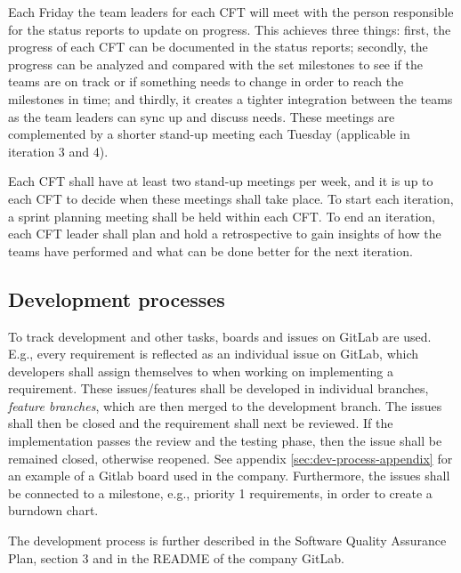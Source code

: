Each Friday the team leaders for each CFT will meet with the person responsible for the status reports to update on progress. This achieves three things: first, the progress of each CFT can be documented in the status reports; secondly, the progress can be analyzed and compared with the set milestones to see if the teams are on track or if something needs to change in order to reach the milestones in time; and thirdly, it creates a tighter integration between the teams as the  team leaders can sync up and discuss needs. These meetings are complemented by a shorter stand-up meeting each Tuesday (applicable in iteration 3 and 4). 

Each CFT shall have at least two stand-up meetings per week, and it is up to each CFT to decide when these meetings shall take place. To start each iteration, a sprint planning meeting shall be held within each CFT. To end an iteration, each CFT leader shall plan and hold a retrospective to gain insights of how the teams have performed and what can be done better for the next iteration. 

\subsection{Development processes}

To track development and other tasks, boards and issues on GitLab are used. E.g., every requirement is reflected as an individual issue on GitLab, which developers shall assign themselves to when working on implementing a requirement. These issues/features shall be developed in individual branches, \emph{feature branches}, which are then merged to the development branch. The issues shall then be closed and the requirement shall next be reviewed. If the implementation passes the review and the testing phase, then the issue shall be remained closed, otherwise reopened. See appendix \ref{sec:dev-process-appendix} for an example of a Gitlab board used in the company. Furthermore, the issues shall be connected to a milestone, e.g., priority 1 requirements, in order to create a burndown chart.  

The development process is further described in the Software Quality Assurance Plan, section 3 and in the README of the company GitLab.

